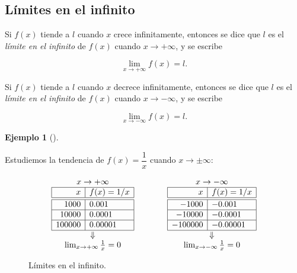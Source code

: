 \documentclass[
  a4paper,
]{scrreport}
\theoremstyle{definition}
\newtheorem{example}{Ejemplo}[chapter]
\theoremstyle{plain}
\theoremstyle{definition}
\theoremstyle{definition}
\theoremstyle{plain}
\theoremstyle{plain}
\theoremstyle{remark}
\begin{document}
\subsection{Límites en el infinito}\label{luxedmites-en-el-infinito}

Si \(f(x)\) tiende a \(l\) cuando \(x\) crece infinitamente, entonces se
dice que \(l\) es el \emph{límite en el infinito} de \(f(x)\) cuando
\(x\to +\infty\), y se escribe

\[\lim_{x\to +\infty}f(x)=l.\]

Si \(f(x)\) tiende a \(l\) cuando \(x\) decrece infinitamente, entonces
se dice que \(l\) es el \emph{límite en el infinito} de \(f(x)\) cuando
\(x\to -\infty\), y se escribe

\[\lim_{x\to -\infty}f(x)=l.\]

\begin{example}[]\protect\hypertarget{exm-limites-infinito}{}\label{exm-limites-infinito}

Estudiemos la tendencia de \(f(x)=\dfrac{1}{x}\) cuando
\(x\to \pm\infty\):

\[
\begin{array}{ccc}
x\to +\infty & \qquad & x\to -\infty\\
\begin{array}{|r|l|}
\hline
x      & f(x)=1/x   \\
\hline\hline
 1000    & 0.001       \\
\hline
 10000   & 0.0001     \\
\hline
 100000  & 0.00001   \\
\hline
\end{array}
& &
\begin{array}{|r|l|}
\hline
x      & f(x)=1/x   \\
\hline\hline
 -1000    & -0.001       \\
\hline
 -10000   & -0.0001     \\
\hline
 -100000  & -0.00001   \\
\hline
\end{array}\\
\Downarrow & & \Downarrow\\
\lim_{x\to +\infty}\frac{1}{x}=0
& &
\lim_{x\to -\infty}\frac{1}{x}=0
\end{array}
\]

\begin{figure}
\centering

\caption{Límites en el infinito.}
\end{figure}

\end{example}
\end{document}
